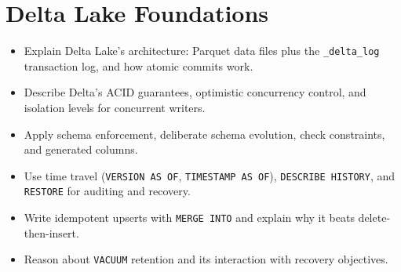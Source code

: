 \chapter{Delta Lake Foundations}
%
%
\begin{objectives}
\begin{itemize}
    \item Explain Delta Lake's architecture: Parquet data files plus the \texttt{\_delta\_log} transaction log, and how atomic commits work.
    \item Describe Delta's ACID guarantees, optimistic concurrency control, and isolation levels for concurrent writers.
    \item Apply schema enforcement, deliberate schema evolution, check constraints, and generated columns.
    \item Use time travel (\texttt{VERSION AS OF}, \texttt{TIMESTAMP AS OF}), \texttt{DESCRIBE HISTORY}, and \texttt{RESTORE} for auditing and recovery.
    \item Write idempotent upserts with \texttt{MERGE INTO} and explain why it beats delete-then-insert.
    \item Reason about \texttt{VACUUM} retention and its interaction with recovery objectives.
\end{itemize}
\end{objectives}

